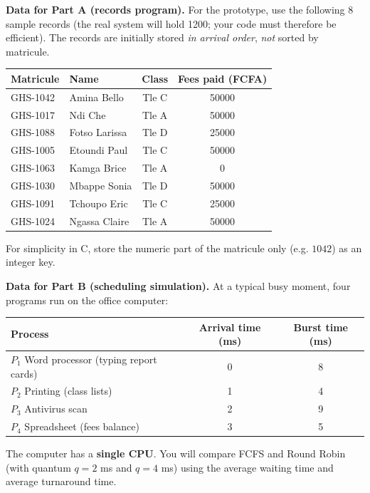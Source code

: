 \documentclass[11pt]{article}
\begin{document}
\textbf{Data for Part A (records program).} For the prototype, use the following 8 sample records (the real system will hold 1200; your code must therefore be efficient). The records are initially stored \emph{in arrival order}, \emph{not} sorted by matricule.

\begin{center}
\begin{tabularx}{\linewidth}{|l|X|c|c|}
\hline
\rowcolor{popblueL} \textbf{Matricule} & \textbf{Name} & \textbf{Class} & \textbf{Fees paid (FCFA)} \\
\hline
GHS-1042 & Amina Bello & Tle C & 50000 \\
\hline
GHS-1017 & Ndi Che & Tle A & 50000 \\
\hline
GHS-1088 & Fotso Larissa & Tle D & 25000 \\
\hline
GHS-1005 & Etoundi Paul & Tle C & 50000 \\
\hline
GHS-1063 & Kamga Brice & Tle A & 0 \\
\hline
GHS-1030 & Mbappe Sonia & Tle D & 50000 \\
\hline
GHS-1091 & Tchoupo Eric & Tle C & 25000 \\
\hline
GHS-1024 & Ngassa Claire & Tle A & 50000 \\
\hline
\end{tabularx}
\end{center}

For simplicity in C, store the numeric part of the matricule only (e.g. $1042$) as an integer key.

\textbf{Data for Part B (scheduling simulation).} At a typical busy moment, four programs run on the office computer:

\begin{center}
\begin{tabular}{|l|c|c|}
\hline
\rowcolor{popblueL} \textbf{Process} & \textbf{Arrival time (ms)} & \textbf{Burst time (ms)} \\
\hline
$P_1$ Word processor (typing report cards) & 0 & 8 \\
\hline
$P_2$ Printing (class lists) & 1 & 4 \\
\hline
$P_3$ Antivirus scan & 2 & 9 \\
\hline
$P_4$ Spreadsheet (fees balance) & 3 & 5 \\
\hline
\end{tabular}
\end{center}

The computer has a \textbf{single CPU}. You will compare FCFS and Round Robin (with quantum $q = 2$ ms and $q = 4$ ms) using the average waiting time and average turnaround time.
\end{document}
